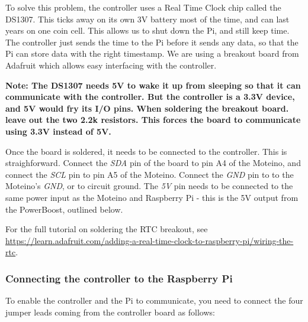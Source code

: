 \documentclass[10pt]{article}
\begin{document}
To solve this problem, the controller uses a Real Time Clock chip called the DS1307. This ticks away on its own 3V battery most of the time, and can last years on one coin cell. This allows us to shut down the Pi, and still keep time. The controller just sends the time to the Pi before it sends any data, so that the Pi can store data with the right timestamp. We are using a breakout board from Adafruit which allows easy interfacing with the controller. \newline

\textbf{Note: The DS1307 needs 5V to wake it up from sleeping so that it can communicate with the controller. But the controller is a 3.3V device, and 5V would fry its I/O pins. When soldering the breakout board. leave out the two 2.2k resistors. This forces the board to communicate using 3.3V instead of 5V.} \newline

Once the board is soldered, it needs to be connected to the controller. This is straighforward. Connect the \textit{SDA} pin of the board to pin A4 of the Moteino, and connect the \textit{SCL} pin to pin A5 of the Moteino. Connect the \textit{GND} pin to to the Moteino's \textit{GND}, or to circuit ground. The \textit{5V} pin needs to be connected to the same power input as the Moteino and Raspberry Pi - this is the 5V output from the PowerBoost, outlined below.

For the full tutorial on soldering the RTC breakout, see \url{https://learn.adafruit.com/adding-a-real-time-clock-to-raspberry-pi/wiring-the-rtc}.

\subsubsection{Connecting the controller to the Raspberry Pi}

To enable the controller and the Pi to communicate, you need to connect the four jumper leads coming from the controller board as follows:
\end{document}
